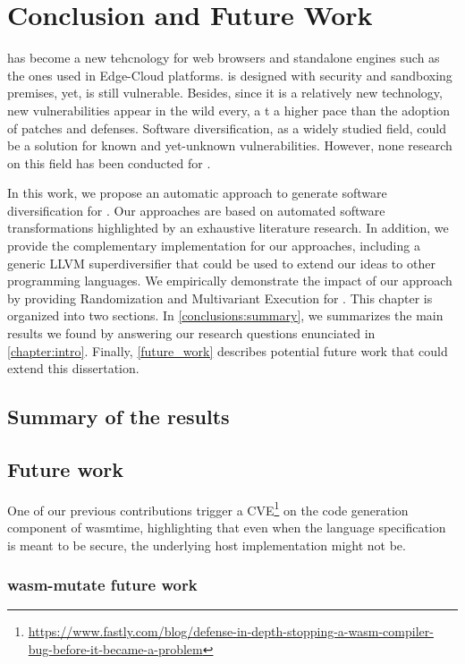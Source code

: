 \chapter{Conclusion and Future Work}
\label{chapter:conclude}

\wasm has become a new tehcnology for web browsers and standalone engines such as the ones used in Edge-Cloud platforms. \wasm is designed with security and sandboxing premises, yet, is still vulnerable.
Besides, since it is a relatively new technology, new vulnerabilities appear in the wild every, a t a higher pace than the adoption of patches and defenses.
Software diversification, as a widely studied field, could be a solution for known and yet-unknown vulnerabilities. However, none research on this field has been conducted for \wasm.

In this work, we propose an automatic approach to generate software diversification for \wasm. 
Our approaches are based on automated software transformations highlighted by an exhaustive literature research.
In addition, we provide the complementary implementation for our approaches, including a generic LLVM superdiversifier that could be used to extend our ideas to other programming languages.
We empirically demonstrate the impact of our approach by providing Randomization and Multivariant Execution for \wasm.
This chapter is organized into two sections. 
In \autoref{conclusions:summary}, we summarizes the main results we found by answering our research questions enunciated in \autoref{chapter:intro}.
Finally, \autoref{future_work} describes potential future work that could extend this dissertation.

\section{Summary of the results}
\label{conclusions:summary}

\section{Future work}
\label{future_work}

One of our previous contributions trigger a CVE\footnote{\url{https://www.fastly.com/blog/defense-in-depth-stopping-a-wasm-compiler-bug-before-it-became-a-problem}} on the code generation component of wasmtime, highlighting that even when the language specification is meant to be secure, the underlying host implementation might not be. 


\subsection{wasm-mutate future work}


